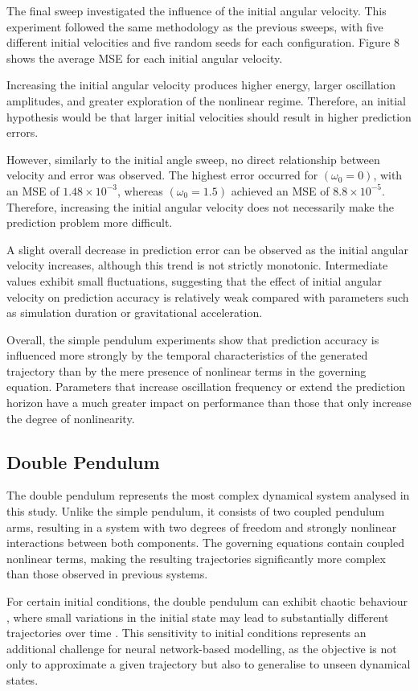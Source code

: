 The final sweep investigated the influence of the initial angular velocity. This experiment followed the same methodology as the previous sweeps, with five different initial velocities and five random seeds for each configuration. Figure 8 shows the average MSE for each initial angular velocity.

Increasing the initial angular velocity produces higher energy, larger oscillation amplitudes, and greater exploration of the nonlinear regime. Therefore, an initial hypothesis would be that larger initial velocities should result in higher prediction errors.

However, similarly to the initial angle sweep, no direct relationship between velocity and error was observed. The highest error occurred for $(\omega_0=0)$, with an MSE of $1.48\times10^{-3}$, whereas $(\omega_0=1.5)$ achieved an MSE of $8.8\times10^{-5}$. Therefore, increasing the initial angular velocity does not necessarily make the prediction problem more difficult.

A slight overall decrease in prediction error can be observed as the initial angular velocity increases, although this trend is not strictly monotonic. Intermediate values exhibit small fluctuations, suggesting that the effect of initial angular velocity on prediction accuracy is relatively weak compared with parameters such as simulation duration or gravitational acceleration.

Overall, the simple pendulum experiments show that prediction accuracy is influenced more strongly by the temporal characteristics of the generated trajectory than by the mere presence of nonlinear terms in the governing equation. Parameters that increase oscillation frequency or extend the prediction horizon have a much greater impact on performance than those that only increase the degree of nonlinearity.

\subsection{Double Pendulum}
The double pendulum represents the most complex dynamical system analysed in this study. Unlike the simple pendulum, it consists of two coupled pendulum arms, resulting in a system with two degrees of freedom and strongly nonlinear interactions between both components. The governing equations contain coupled nonlinear terms, making the resulting trajectories significantly more complex than those observed in previous systems.

For certain initial conditions, the double pendulum can exhibit chaotic behaviour \cite{strogatz2015nonlinear}, where small variations in the initial state may lead to substantially different trajectories over time \cite{lorenz1963deterministic}. This sensitivity to initial conditions represents an additional challenge for neural network-based modelling, as the objective is not only to approximate a given trajectory but also to generalise to unseen dynamical states.

